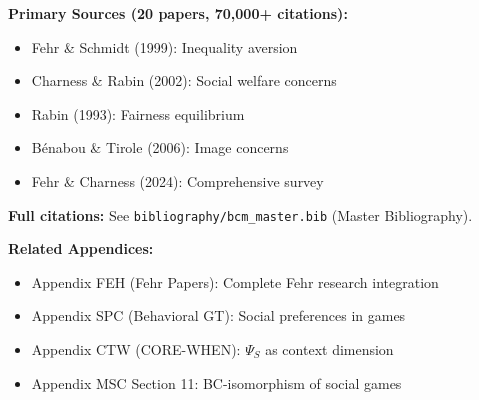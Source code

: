 \textbf{Primary Sources (20 papers, 70,000+ citations):}
\begin{itemize}[nosep]
    \item Fehr \& Schmidt (1999): Inequality aversion
    \item Charness \& Rabin (2002): Social welfare concerns
    \item Rabin (1993): Fairness equilibrium
    \item Bénabou \& Tirole (2006): Image concerns
    \item Fehr \& Charness (2024): Comprehensive survey
\end{itemize}

\textbf{Full citations:} See \texttt{bibliography/bcm\_master.bib} (Master Bibliography).

\textbf{Related Appendices:}
\begin{itemize}[nosep]
    \item Appendix FEH (Fehr Papers): Complete Fehr research integration
    \item Appendix SPC (Behavioral GT): Social preferences in games
    \item Appendix CTW (CORE-WHEN): $\Psi_S$ as context dimension
    \item Appendix MSC Section 11: BC-isomorphism of social games
\end{itemize}

